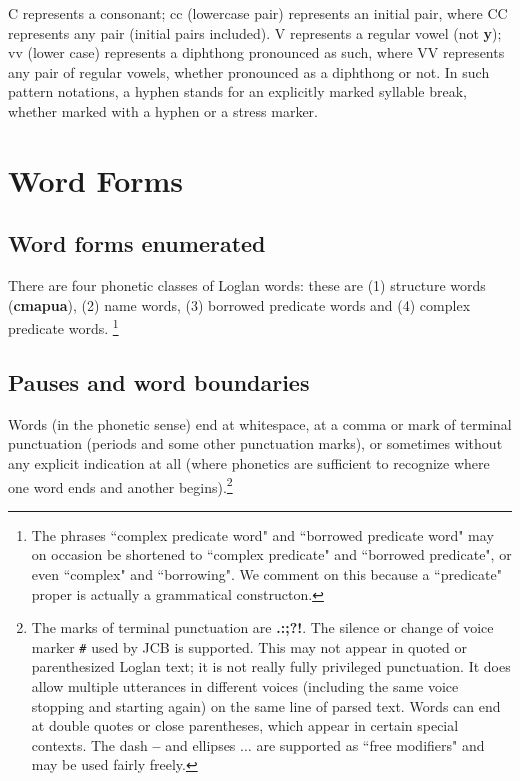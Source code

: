 \documentclass[12pt]{book}
\begin{document}
C represents a consonant; cc (lowercase pair) represents an initial pair, where CC represents any pair (initial pairs included).  V represents a regular vowel (not {\bf y}); vv (lower case) represents a diphthong pronounced as such, where VV represents any pair of regular vowels, whether pronounced as a diphthong or not.  In such pattern notations, a hyphen stands for an explicitly marked syllable break, whether marked with a hyphen or a stress marker.

\section{Word Forms}

\subsection{Word forms enumerated}

There are four phonetic classes of Loglan words:  these are (1) structure words ({\bf cmapua}), (2) name words, (3) borrowed predicate words and (4) complex predicate words.  \footnote{The phrases ``complex predicate word" and ``borrowed predicate word" may on occasion be shortened to ``complex predicate"
and ``borrowed predicate", or even ``complex" and ``borrowing".  We comment on this because a ``predicate" proper is actually a grammatical constructon.}

\subsection{Pauses and word boundaries}

Words (in the phonetic sense) end at whitespace, at a comma or mark of terminal punctuation (periods and some other punctuation marks), or sometimes without any explicit indication at all (where phonetics are sufficient to recognize where one word ends and another begins).\footnote{The marks of terminal punctuation are {\bf .:;?!}.  
The silence or change of voice marker {\tt \#} used by JCB is supported.   This may not appear in quoted or parenthesized Loglan text; it is not really fully privileged punctuation.  It does allow multiple utterances in different voices (including the same voice stopping and starting again) on the same line of parsed text.  Words can end at double quotes or close parentheses, which appear in certain special contexts.  The dash {\bf --} and ellipses $\ldots$ are supported as ``free modifiers" and may be used fairly freely.}
\end{document}
